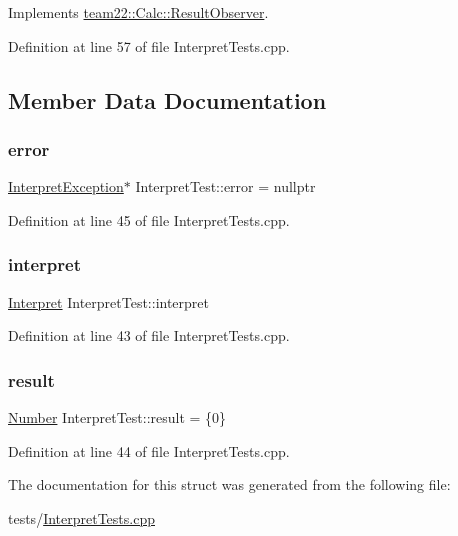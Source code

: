 Implements \hyperlink{classteam22_1_1_calc_1_1_result_observer_aa04007df3aa8a499c3a511f549238285}{team22\+::\+Calc\+::\+Result\+Observer}.



Definition at line 57 of file Interpret\+Tests.\+cpp.



\subsection{Member Data Documentation}
\mbox{\label{struct_interpret_test_aace2257ef8c92219d240f5e2e430bd2b}} 
\subsubsection{\texorpdfstring{error}{error}}
{\footnotesize\ttfamily \hyperlink{class_interpret_exception}{Interpret\+Exception}$\ast$ Interpret\+Test\+::error = nullptr}



Definition at line 45 of file Interpret\+Tests.\+cpp.

\mbox{\label{struct_interpret_test_a3905fe89984120323e1dd28b2abd6052}} 
\subsubsection{\texorpdfstring{interpret}{interpret}}
{\footnotesize\ttfamily \hyperlink{classteam22_1_1_calc_1_1_interpret}{Interpret} Interpret\+Test\+::interpret}



Definition at line 43 of file Interpret\+Tests.\+cpp.

\mbox{\label{struct_interpret_test_a8a1290387dfa72192d3ea06873ff8e73}} 
\subsubsection{\texorpdfstring{result}{result}}
{\footnotesize\ttfamily \hyperlink{classteam22_1_1_math_1_1_number}{Number} Interpret\+Test\+::result = \{0\}}



Definition at line 44 of file Interpret\+Tests.\+cpp.



The documentation for this struct was generated from the following file\+:\begin{DoxyCompactItemize}
\item 
tests/\hyperlink{_interpret_tests_8cpp}{Interpret\+Tests.\+cpp}\end{DoxyCompactItemize}
